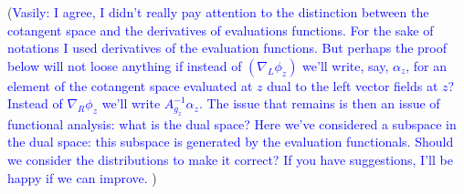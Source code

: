 \documentclass[11pt, oneside, reqno]{amsart}
\theoremstyle{definition} \newtheorem{definition}{Definition}[section]
\theoremstyle{definition} \newtheorem{remark}[definition]{Remark}
\theoremstyle{definition} \newtheorem{remarks}[definition]{Remarks}
\theoremstyle{definition} \newtheorem{question}[definition]{Question}
\theoremstyle{definition} \newtheorem*{note}{Note}
\theoremstyle{definition} \newtheorem{example}[definition]{Example}
\theoremstyle{definition} \newtheorem{examples}[definition]{Examples}
\newcommand{\vasily}[1]{(\textcolor{blue}{Vasily: #1})}
\begin{document}
\vasily{I agree, I didn't really pay 
attention to the distinction between the cotangent
  space and the derivatives of evaluations functions. For the
  sake of notations I used derivatives of the evaluation functions.
  But perhaps the proof below will not loose anything if instead
  of $(\nabla_{L} \phi_z)$ we'll write, say, $\alpha_z$, for an element
  of the cotangent space evaluated at $z$ dual to the left
  vector fields at $z$? Instead of $\nabla_{R} \phi_{z}$ we'll write
  $A_{g_{z}}^{-1} \alpha_z$. The issue that remains is then an issue
  of functional analysis: what is the dual space? Here we've considered
  a subspace in the dual space: this subspace
 is generated by the evaluation functionals.
  Should we consider the distributions to make it correct? If
  you have suggestions, I'll be happy if we can improve. 
} 
\end{document}
